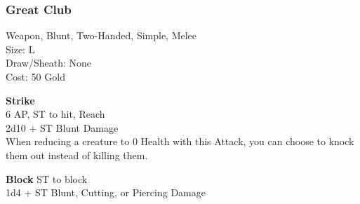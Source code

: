 \subsubsection{Great Club}\label{weapon:greatClub}
Weapon, Blunt, Two-Handed, Simple, Melee\\
Size: L\\
Draw/Sheath: None\\
Cost: 50 Gold

\textbf{Strike} \\
6 AP, ST to hit,  Reach\\
2d10 + \texttimes ST Blunt Damage\\
When reducing a creature to 0 Health with this Attack, you can choose to knock them out instead of killing them.

\textbf{Block}
ST to block\\
1d4 + \texttimes ST Blunt, Cutting, or Piercing Damage

